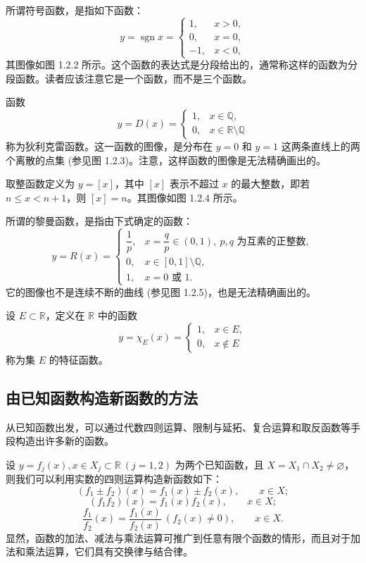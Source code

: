 \documentclass[UTF8,12pt,a4paper,fontset=fandol]{ctexbook}
\begin{document}
\noindent{}\quad 所谓符号函数，是指如下函数：
\[
  y=\operatorname{sgn}x=
  \begin{cases}
    1, & x>0,\\
    0, & x=0,\\
    -1, & x<0,
  \end{cases}
\]
其图像如图 1.2.2 所示。这个函数的表达式是分段给出的，通常称这样的函数为分段函数。读者应该注意它是一个函数，而不是三个函数。

\noindent{}\quad 函数
\[
  y=D(x)=
  \begin{cases}
    1, & x\in\mathbb{Q},\\
    0, & x\in\mathbb{R}\setminus\mathbb{Q}
  \end{cases}
\]
称为狄利克雷函数。这一函数的图像，是分布在 $y=0$ 和 $y=1$ 这两条直线上的两个离散的点集 (参见图 1.2.3)。注意，这样函数的图像是无法精确画出的。

\noindent{}\quad 取整函数定义为 $y=[x]$，其中 $[x]$ 表示不超过 $x$ 的最大整数，即若 $n\le x<n+1$，则 $[x]=n$。其图像如图 1.2.4 所示。

\noindent{}\quad 所谓的黎曼函数，是指由下式确定的函数：
\[
  y=R(x)=
  \begin{cases}
    \dfrac1p, & x=\dfrac qp\in(0,1),\ p,q\text{ 为互素的正整数},\\
    0, & x\in[0,1]\setminus\mathbb{Q},\\
    1, & x=0\text{ 或 }1.
  \end{cases}
\]
它的图像也不是连续不断的曲线 (参见图 1.2.5)，也是无法精确画出的。

\noindent{}\quad 设 $E\subset\mathbb{R}$，定义在 $\mathbb{R}$ 中的函数
\[
  y=\chi_E(x)=
  \begin{cases}
    1, & x\in E,\\
    0, & x\notin E
  \end{cases}
\]
称为集 $E$ 的特征函数。

\subsection{由已知函数构造新函数的方法}

从已知函数出发，可以通过代数四则运算、限制与延拓、复合运算和取反函数等手段构造出许多新的函数。

\noindent{}

设 $y=f_j(x),x\in X_j\subset\mathbb{R}\ (j=1,2)$ 为两个已知函数，且 $X=X_1\cap X_2\ne\varnothing$，则我们可以利用实数的四则运算构造新函数如下：
\[
  (f_1\pm f_2)(x)=f_1(x)\pm f_2(x),\qquad x\in X;
\]
\[
  (f_1f_2)(x)=f_1(x)f_2(x),\qquad x\in X;
\]
\[
  \frac{f_1}{f_2}(x)=\frac{f_1(x)}{f_2(x)}\ (f_2(x)\ne0),\qquad x\in X.
\]
显然，函数的加法、减法与乘法运算可推广到任意有限个函数的情形，而且对于加法和乘法运算，它们具有交换律与结合律。
\end{document}
